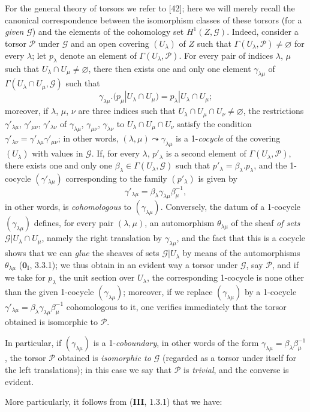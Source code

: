 \begin{env}[16.5.15]
For the general theory of torsors we refer to [42]; here we will
merely recall the canonical correspondence between the isomorphism classes
of these torsors (for a \emph{given} $\mathscr{G}$) and the elements of
the cohomology set $H^1(Z,\mathscr{G})$. Indeed, consider a
torsor $\mathscr{P}$ under $\mathscr{G}$ and an open covering
$(U_\lambda)$ of $Z$ such that
$\Gamma(U_\lambda,\mathscr{P})\neq\varnothing$ for every $\lambda$;
let $p_\lambda$ denote an element of
$\Gamma(U_\lambda,\mathscr{P})$. For every pair of indices $\lambda$, $\mu$
such that $U_\lambda\cap U_\mu\neq\varnothing$, there then exists one and
only one element $\gamma_{\lambda\mu}$ of
$\Gamma(U_\lambda\cap U_\mu,\mathscr{G})$ such that
\[
  \gamma_{\lambda\mu}.
  (p_\mu|U_\lambda\cap U_\mu)=p_\lambda|U_\lambda\cap U_\mu;
\]
moreover, if $\lambda$, $\mu$, $\nu$ are three indices such that
$U_\lambda\cap U_\mu\cap U_\nu\neq\varnothing$, the restrictions
$\gamma'_{\lambda\mu}$, $\gamma'_{\mu\nu}$, $\gamma'_{\lambda\nu}$ of
$\gamma_{\lambda\mu}$, $\gamma_{\mu\nu}$, $\gamma_{\lambda\nu}$ to
$U_\lambda\cap U_\mu\cap U_\nu$ satisfy the condition
$\gamma'_{\lambda\nu}=\gamma'_{\lambda\mu}\gamma'_{\mu\nu}$; in other words,
$(\lambda,\mu)\leadsto\gamma_{\lambda\mu}$ is a 1-\emph{cocycle} of the
covering $(U_\lambda)$ with values in $\mathscr{G}$. If, for every
$\lambda$, $p'_\lambda$ is a second element of
$\Gamma(U_\lambda,\mathscr{P})$, there exists one and only one
$\beta_\lambda\in\Gamma(U_\lambda,\mathscr{G})$ such that
$p'_\lambda=\beta_\lambda.p_\lambda$, and the 1-cocycle
$(\gamma'_{\lambda\mu})$ corresponding to the family $(p'_\lambda)$ is given
by
\[
  \gamma'_{\lambda\mu}=\beta_\lambda\gamma_{\lambda\mu}\beta_\mu^{-1},
\]
in other words, is \emph{cohomologous} to $(\gamma_{\lambda\mu})$.
Conversely, the datum of a 1-cocycle $(\gamma_{\lambda\mu})$ defines, for
every pair $(\lambda,\mu)$, an automorphism $\theta_{\lambda\mu}$ of the
sheaf \emph{of sets}
$\mathscr{G}|U_\lambda\cap U_\mu$, namely the right translation by
$\gamma_{\lambda\mu}$, and the fact that this is a cocycle shows that we
can \emph{glue} the sheaves of sets $\mathscr{G}|U_\lambda$ by
means of the automorphisms $\theta_{\lambda\mu}$ ($\mathbf{0}_{\mathrm I}$, 3.3.1); we thus obtain
in an evident way a torsor under $\mathscr{G}$, say $\mathscr{P}$, and if
we take for $p_\lambda$ the unit section over $U_\lambda$, the
corresponding 1-cocycle is none other than the given 1-cocycle
$(\gamma_{\lambda\mu})$; moreover, if we replace
$(\gamma_{\lambda\mu})$ by a 1-cocycle
$\gamma'_{\lambda\mu}=\beta_\lambda\gamma_{\lambda\mu}\beta_\mu^{-1}$
cohomologous to it, one verifies immediately that the torsor obtained is
isomorphic to $\mathscr{P}$.

In particular, if $(\gamma_{\lambda\mu})$ is a 1-\emph{coboundary}, in other
words of the form
$\gamma_{\lambda\mu}=\beta_\lambda\beta_\mu^{-1}$, the torsor
$\mathscr{P}$ obtained is \emph{isomorphic to $\mathscr{G}$} (regarded as a torsor
under itself for the left translations); in this case we say that
$\mathscr{P}$ is \emph{trivial}, and the converse is evident.

More particularly, it follows from (\textbf{III}, 1.3.1) that we have:
\end{env}

